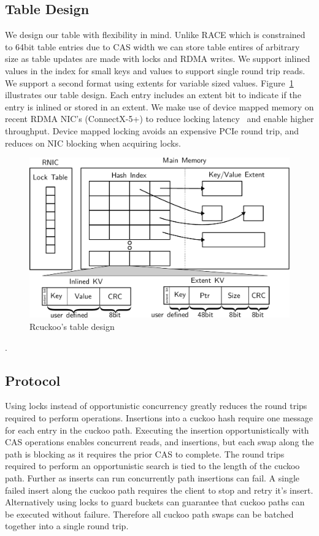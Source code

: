 \subsection{Table Design}

We design our table with flexibility in mind. Unlike RACE
which is constrained to 64bit table entries due to CAS width
we can store table entires of arbitrary size as table
updates are made with locks and RDMA writes. We support
inlined values in the index for small keys and values to
support single round trip reads. We support a second format
using extents for variable sized values.
Figure~\ref{fig:table-diagram} illustrates our table design.
Each entry includes an extent bit to indicate if the entry
is inlined or stored in an extent.  We make use of device
mapped memory on recent RDMA NIC's (ConnectX-5+) to reduce
locking latency~\cite{sherman} and enable higher throughput.
Device mapped locking avoids an expensive PCIe round trip,
and reduces on NIC blocking when acquiring locks.


\begin{figure}[t]
    \includegraphics[width=0.99\linewidth]{fig/table-diagram.pdf}
    \caption{Rcuckoo's table design}
    \label{fig:table-diagram}
\end{figure}.


\subsection{Protocol}

Using locks instead of opportunistic concurrency greatly
reduces the round trips required to perform operations.
Insertions into a cuckoo hash require one message for each
entry in the cuckoo path. Executing the insertion
opportunistically with CAS operations enables concurrent
reads, and insertions, but each swap along the path is
blocking as it requires the prior CAS to complete. The round
trips required to perform an opportunistic search is tied to
the length of the cuckoo path. Further as inserts can run
concurrently path insertions can fail. A single failed
insert along the cuckoo path requires the client to stop and
retry it's insert. Alternatively using locks to guard
buckets can guarantee that cuckoo paths can be executed
without failure. Therefore all cuckoo path swaps can be
batched together into a single round trip.

